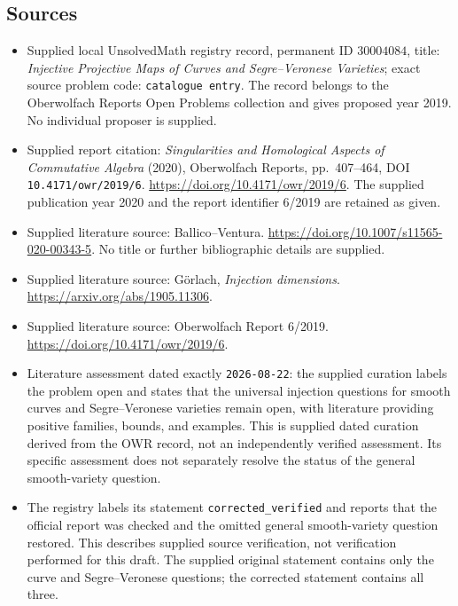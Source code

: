 \documentclass[11pt]{article}
\begin{document}
\subsection{Sources}
\begin{itemize}
\item Supplied local UnsolvedMath registry record, permanent ID \(30004084\), title: \emph{Injective Projective Maps of Curves and Segre--Veronese Varieties}; exact source problem code: \texttt{catalogue entry}. The record belongs to the Oberwolfach Reports Open Problems collection and gives proposed year 2019. No individual proposer is supplied.
\item Supplied report citation: \emph{Singularities and Homological Aspects of Commutative Algebra} (2020), Oberwolfach Reports, pp.~407--464, DOI \texttt{10.4171/owr/2019/6}. \url{https://doi.org/10.4171/owr/2019/6}. The supplied publication year 2020 and the report identifier 6/2019 are retained as given.
\item Supplied literature source: Ballico--Ventura. \url{https://doi.org/10.1007/s11565-020-00343-5}. No title or further bibliographic details are supplied.
\item Supplied literature source: G\"orlach, \emph{Injection dimensions}. \url{https://arxiv.org/abs/1905.11306}.
\item Supplied literature source: Oberwolfach Report 6/2019. \url{https://doi.org/10.4171/owr/2019/6}.
\item Literature assessment dated exactly \texttt{2026-08-22}: the supplied curation labels the problem open and states that the universal injection questions for smooth curves and Segre--Veronese varieties remain open, with literature providing positive families, bounds, and examples. This is supplied dated curation derived from the OWR record, not an independently verified assessment. Its specific assessment does not separately resolve the status of the general smooth-variety question.
\item The registry labels its statement \texttt{corrected\_verified} and reports that the official report was checked and the omitted general smooth-variety question restored. This describes supplied source verification, not verification performed for this draft. The supplied original statement contains only the curve and Segre--Veronese questions; the corrected statement contains all three.
\end{itemize}
\end{document}
